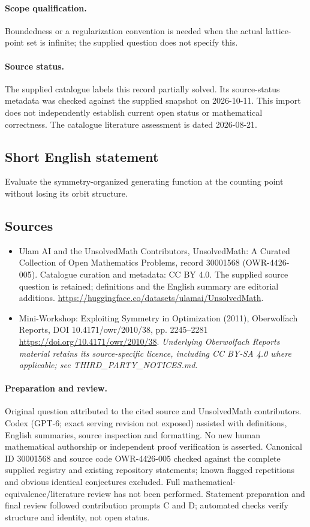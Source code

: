 \documentclass[11pt]{article}
\begin{document}
\paragraph{Scope qualification.}
Boundedness or a regularization convention is needed when the actual lattice-point set is infinite; the supplied question does not specify this.
\paragraph{Source status.}
The supplied catalogue labels this record partially solved. Its source-status metadata was checked against the supplied snapshot on 2026-10-11. This import does not independently establish current open status or mathematical correctness. The catalogue literature assessment is dated 2026-08-21.
\subsection{Short English statement}
Evaluate the symmetry-organized generating function at the counting point without losing its orbit structure.
\subsection{Sources}
\begin{itemize}
\item[S1] Ulam AI and the UnsolvedMath Contributors, UnsolvedMath: A Curated Collection of Open Mathematics Problems, record 30001568 (OWR-4426-005). Catalogue curation and metadata: CC BY 4.0. The supplied source question is retained; definitions and the English summary are editorial additions.
\url{https://huggingface.co/datasets/ulamai/UnsolvedMath}.
\item[S2] Mini-Workshop: Exploiting Symmetry in Optimization (2011), Oberwolfach Reports, DOI 10.4171/owr/2010/38, pp. 2245--2281
\url{https://doi.org/10.4171/owr/2010/38}.
\textit{Underlying Oberwolfach Reports material retains its source-specific licence, including CC BY-SA 4.0 where applicable; see THIRD\_PARTY\_NOTICES.md.}
\end{itemize}
\paragraph{Preparation and review.}
Original question attributed to the cited source and UnsolvedMath contributors. Codex (GPT-6; exact serving revision not exposed) assisted with definitions, English summaries, source inspection and formatting. No new human mathematical authorship or independent proof verification is asserted. Canonical ID 30001568 and source code OWR-4426-005 checked against the complete supplied registry and existing repository statements; known flagged repetitions and obvious identical conjectures excluded. Full mathematical-equivalence/literature review has not been performed. Statement preparation and final review followed contribution prompts C and D; automated checks verify structure and identity, not open status.
\label{end:30001568}
\end{document}

